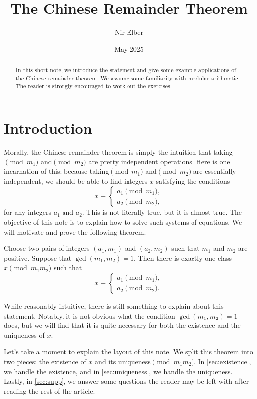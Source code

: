 \documentclass{article}
\title{The Chinese Remainder Theorem}
\author{Nir Elber}
\date{May 2025}
\begin{document}
\maketitle

\begin{abstract}
	In this short note, we introduce the statement and give some example applications of the Chinese remainder theorem. We assume some familiarity with modular arithmetic. The reader is strongly encouraged to work out the exercises.
\end{abstract}

\tableofcontents

\setcounter{section}{0}
\section{Introduction}
Morally, the Chinese remainder theorem is simply the intuition that taking$\pmod{m_1}$ and$\pmod{m_2}$ are pretty independent operations. Here is one incarnation of this: because taking$\pmod{m_1}$ and$\pmod{m_2}$ are essentially independent, we should be able to find integers $x$ satisfying the conditions
\[x\equiv\begin{cases}
	a_1\pmod{m_1}, \\
	a_2\pmod{m_2},
\end{cases}\]
for any integers $a_1$ and $a_2$. This is not literally true, but it is almost true. The objective of this note is to explain how to solve such systems of equations. We will motivate and prove the following theorem.
\begin{theorem} \label{thm:crt}
	Choose two pairs of integers $(a_1,m_1)$ and $(a_2,m_2)$ such that $m_1$ and $m_2$ are positive. Suppose that $\gcd(m_1,m_2)=1$. Then there is exactly one class $x\pmod{m_1m_2}$ such that
	\[x\equiv\begin{cases}
		a_1 \pmod{m_1}, \\
		a_2 \pmod{m_2}.
	\end{cases}\]
\end{theorem}
While reasonably intuitive, there is still something to explain about this statement. Notably, it is not obvious what the condition $\gcd(m_1,m_2)=1$ does, but we will find that it is quite necessary for both the existence and the uniqueness of $x$.

Let's take a moment to explain the layout of this note. We split this theorem into two pieces: the existence of $x$ and its uniqueness$\pmod{m_1m_2}$. In \cref{sec:existence}, we handle the existence, and in \cref{sec:uniqueness}, we handle the uniqueness. Lastly, in \cref{sec:supp}, we answer some questions the reader may be left with after reading the rest of the article.
\end{document}
